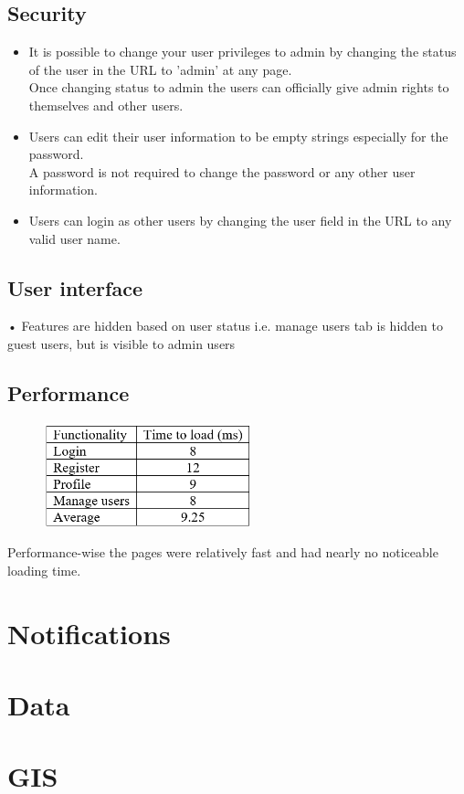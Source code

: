 \documentclass[english]{article}
\begin{document}
\subsection{Security}
\begin{itemize}
     \item It is possible to change your user privileges to admin by changing the status of the user in the URL to 'admin' at any page.\\
     Once changing status to admin the users can officially give admin rights to themselves and other users.
     \item Users can edit their user information to be empty strings especially for the password.\\
     A password is not required to change the password or any other user information.
     \item Users can login as other users by changing the user field in the URL to any valid user name.
   \end{itemize}
\subsection{User interface}
•	Features are hidden based on user status i.e. manage users tab is hidden to guest users, but is visible to admin users\\
\subsection{Performance}
\begin{figure}[H]
\includegraphics[width=60mm]{15.png}
\end{figure}
Performance-wise the pages were relatively fast and had nearly no noticeable loading time.
\section{Notifications}
\section{Data}
\section{GIS}
\end{document}
